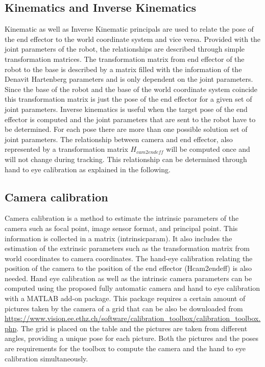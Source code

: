 \documentclass[letterpaper, 10 pt, conference]{ieeeconf}  %
\begin{document}
\subsection{Kinematics and Inverse Kinematics}
Kinematic as well as Inverse Kinematic principals are used to relate the pose of the end effector to the world coordinate system and vice versa. Provided with the joint parameters of the robot, the relationships are described through simple transformation matrices. The transformation matrix from end effector of the robot to the base is described by a matrix filled with the information of the Denavit Hartenberg parameters and is only dependent on the joint parameters. Since the base of the robot and the base of the world coordinate system coincide this transformation matrix is just the pose of the end effector for a given set of joint parameters. Inverse kinematics is useful when the target pose of the end effector is computed and the joint parameters that are sent to the robot have to be determined. For each pose there are more than one possible solution set of joint parameters. The relationship between camera and end effector, also represented by a transformation matrix $H_{cam2endeff}$ will be computed once and will not change during tracking. This relationship can be determined through hand to eye calibration as explained in the following.
\subsection{Camera calibration}
Camera calibration is a method to estimate the intrinsic  parameters of the camera such as focal point, image sensor format, and principal point. This information is collected in a matrix (intrinsicparam). It also includes the estimation of the extrinsic parameters such as the transformation matrix from world coordinates to camera coordinates. The hand-eye calibration relating the position of the camera to the position of the end effector (Hcam2endeff) is also needed. Hand eye calibration as well as the intrinsic camera parameters can be computed using the proposed fully automatic camera and hand to eye calibration with a MATLAB add-on package. This package requires a certain amount of pictures taken by the camera of a grid that can be also be downloaded from \url{https://www.vision.ee.ethz.ch/software/calibration_toolbox/calibration_toolbox.php}. The grid is placed on the table and the pictures are taken from different angles, providing a unique pose for each picture. Both the pictures and the poses are requirements for the toolbox to compute the camera and the hand to eye calibration simultaneously.
\end{document}
